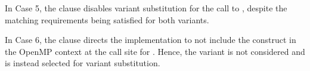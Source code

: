 In Case 5, the  clause disables variant
substitution for the call to , despite the matching requirements
being satisfied for both variants.

In Case 6, the   clause directs the implementation to not
include the  construct in the OpenMP context at the call site
for . Hence, the  variant is not considered
and  is instead selected for variant substitution.


